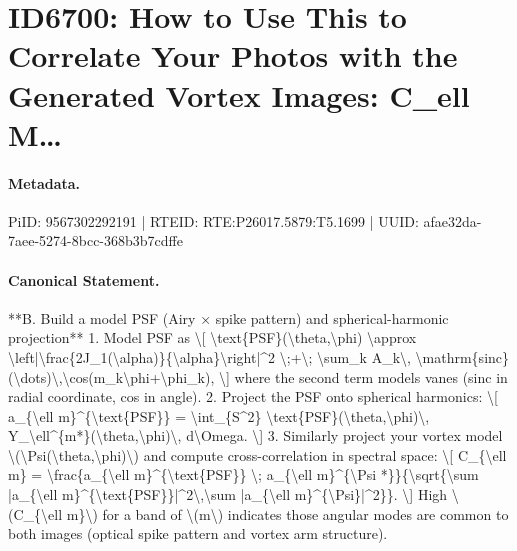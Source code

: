 \section*{ID6700: How to Use This to Correlate Your Photos with the Generated Vortex Images: C\_ell M…}
\paragraph{Metadata.}
PiID: 9567302292191 | RTEID: RTE:P26017.5879:T5.1699 | UUID: afae32da-7aee-5274-8bcc-368b3b7cdffe

\paragraph{Canonical Statement.}
**B. Build a model PSF (Airy × spike pattern) and spherical-harmonic projection** 1. Model PSF as \textbackslash{}[ \textbackslash{}text\{PSF\}(\textbackslash{}theta,\textbackslash{}phi) \textbackslash{}approx \textbackslash{}left|\textbackslash{}frac\{2J\_1(\textbackslash{}alpha)\}\{\textbackslash{}alpha\}\textbackslash{}right|\textasciicircum{}2 \textbackslash{};+\textbackslash{}; \textbackslash{}sum\_k A\_k\textbackslash{}, \textbackslash{}mathrm\{sinc\}(\textbackslash{}dots)\textbackslash{},\textbackslash{}cos(m\_k\textbackslash{}phi+\textbackslash{}phi\_k), \textbackslash{}] where the second term models vanes (sinc in radial coordinate, cos in angle). 2. Project the PSF onto spherical harmonics: \textbackslash{}[ a\_\{\textbackslash{}ell m\}\textasciicircum{}\{\textbackslash{}text\{PSF\}\} = \textbackslash{}int\_\{S\textasciicircum{}2\} \textbackslash{}text\{PSF\}(\textbackslash{}theta,\textbackslash{}phi)\textbackslash{}, Y\_\textbackslash{}ell\textasciicircum{}\{m*\}(\textbackslash{}theta,\textbackslash{}phi)\textbackslash{}, d\textbackslash{}Omega. \textbackslash{}] 3. Similarly project your vortex model \textbackslash{}(\textbackslash{}Psi(\textbackslash{}theta,\textbackslash{}phi)\textbackslash{}) and compute cross-correlation in spectral space: \textbackslash{}[ C\_\{\textbackslash{}ell m\} = \textbackslash{}frac\{a\_\{\textbackslash{}ell m\}\textasciicircum{}\{\textbackslash{}text\{PSF\}\} \textbackslash{}; a\_\{\textbackslash{}ell m\}\textasciicircum{}\{\textbackslash{}Psi *\}\}\{\textbackslash{}sqrt\{\textbackslash{}sum |a\_\{\textbackslash{}ell m\}\textasciicircum{}\{\textbackslash{}text\{PSF\}\}|\textasciicircum{}2\textbackslash{},\textbackslash{}sum |a\_\{\textbackslash{}ell m\}\textasciicircum{}\{\textbackslash{}Psi\}|\textasciicircum{}2\}\}. \textbackslash{}] High \textbackslash{}(C\_\{\textbackslash{}ell m\}\textbackslash{}) for a band of \textbackslash{}(m\textbackslash{}) indicates those angular modes are common to both images (optical spike pattern and vortex arm structure).

